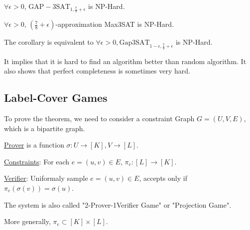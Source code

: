 \begin{theorem}\label{thm:gap3sat}
    $ \forall \epsilon>0 $,  $ \mathrm{GAP-3SAT}_{1,\frac{7}{8}+\epsilon} $ is NP-Hard.  
\end{theorem}
\begin{corollary}
    $ \forall \epsilon>0 $,  $ (\frac{7}{8}+\epsilon) $-approximation Max3SAT is NP-Hard. 
\end{corollary}

The corollary is equivalent to  $ \forall \epsilon>0,\mathrm{Gap3SAT}_{1-\epsilon,\frac{7}{8}+\epsilon} $ is NP-Hard.

\begin{remark}
    It implies that  it is hard to find an algorithm better than random algorithm. It also shows that perfect completeness is sometimes very hard.
\end{remark}

\subsection{Label-Cover Games}

To prove the theorem, we need to consider a constraint Graph  $ G=(U,V,E) $, which is a bipartite graph. 

\underline{Prover} is a function  $ \sigma:U\rightarrow [K],V\rightarrow [L] $. 

\underline{Constraints}: For each  $ e=(u,v)\in E $,  $ \pi_e:[L]\rightarrow [K] $.

\underline{Verifier}: Uniformaly sample  $ e=(u,v)\in  E $, accepts only if  $ \pi_e(\sigma(v))=\sigma(u) $.

The system is also called  "2-Prover-1Verifier  Game" or "Projection Game".

More generally,  $ \pi_e\subset [K]\times [L] $.

